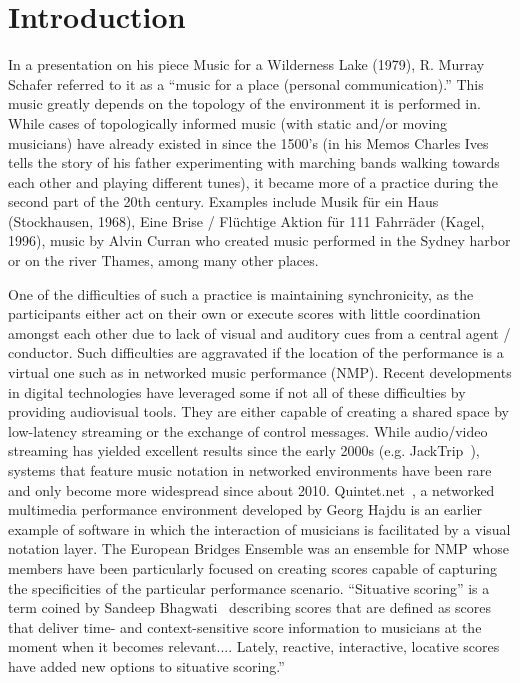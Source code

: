
\section{Introduction}\label{sec:intro}

%
%
%

In a presentation on his piece Music for a Wilderness Lake (1979), R. Murray Schafer referred to it as a ``music for a place (personal communication).'' 
This music greatly depends on the topology of the environment it is performed in. While cases of topologically informed music (with static and/or moving musicians) have already existed in since the 1500’s (in his Memos Charles Ives tells the story of his father experimenting with marching bands walking towards each other and playing different tunes), it became more of a practice during the second part of the 20th century. Examples include Musik f\"ur ein Haus (Stockhausen, 1968), Eine Brise / Fl\"uchtige Aktion f\"ur 111 Fahrr\"ader (Kagel, 1996), music by Alvin Curran who created music performed in the Sydney harbor or on the river Thames, among many other places.

One of the difficulties of such a practice is maintaining synchronicity, as the participants either act on their own or execute scores with little coordination amongst each other due to lack of visual and auditory cues from a central agent / conductor. Such difficulties are aggravated if the location of the performance is a virtual one such as in networked music performance (NMP). Recent developments in digital technologies have leveraged some if not all of these difficulties by providing audiovisual tools. They are either capable of creating a shared space by low-latency streaming or the exchange of control messages. While audio/video streaming has yielded excellent results since the early 2000s  (e.g. JackTrip~\cite{caceres2010jacktrip}), systems that feature music notation in networked environments have been rare and only become more widespread since about 2010. Quintet.net~\cite{hajdu2005quintet}, a networked multimedia performance environment developed by Georg Hajdu is an earlier example of software in which the interaction of musicians is facilitated by a visual notation layer. The European Bridges Ensemble was an ensemble for NMP whose members have been particularly focused on creating scores capable of capturing the specificities of the particular performance scenario. ``Situative scoring'' is a term coined by Sandeep Bhagwati~\cite{bhagwati2017vexations} describing scores that are defined as scores that deliver time- and context-sensitive score information to musicians at the moment when it becomes relevant.... Lately, reactive, interactive, locative scores have added new options to situative scoring.''

